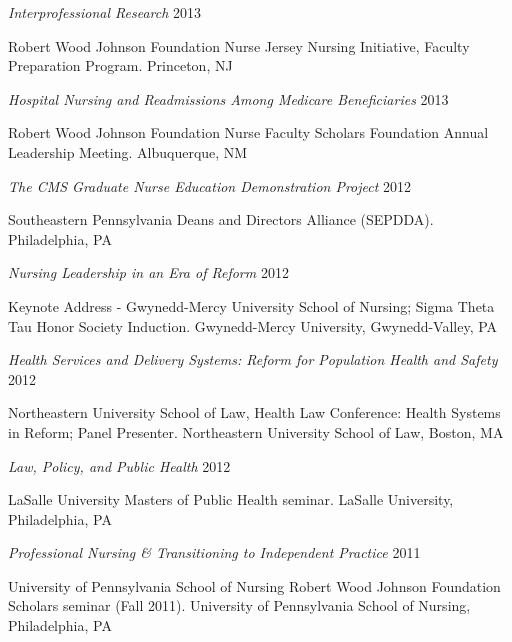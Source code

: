 \documentclass[10pt,]{article}
\begin{document}
{{{{{{{{{{{{{{{\begin{hangparas}{.5in}{1}
{\textit {Interprofessional Research}} \hfill 2013 
\vspace{-2.5mm}
\begin{adjustwidth}{0.5cm}{1cm}
Robert Wood Johnson Foundation Nurse Jersey Nursing Initiative, Faculty Preparation Program. Princeton, NJ
\end{adjustwidth}

{\textit {Hospital Nursing and Readmissions Among Medicare Beneficiaries}} \hfill 2013 
\vspace{-2.5mm}
\begin{adjustwidth}{0.5cm}{1cm}
Robert Wood Johnson Foundation Nurse Faculty Scholars Foundation Annual Leadership Meeting. Albuquerque, NM
\end{adjustwidth}

{\textit {The CMS Graduate Nurse Education Demonstration Project}} \hfill 2012 
\vspace{-2.5mm}
\begin{adjustwidth}{0.5cm}{1cm}
Southeastern Pennsylvania Deans and Directors Alliance (SEPDDA). Philadelphia, PA
\end{adjustwidth}

{\textit {Nursing Leadership in an Era of Reform}} \hfill 2012 
\vspace{-2.5mm}
\begin{adjustwidth}{0.5cm}{1cm}
Keynote Address - Gwynedd-Mercy University School of Nursing; Sigma Theta Tau Honor Society Induction. Gwynedd-Mercy University, Gwynedd-Valley, PA
\end{adjustwidth}

{\textit {Health Services and Delivery Systems: Reform for Population Health and Safety}} \hfill 2012 
\vspace{-2.5mm}
\begin{adjustwidth}{0.5cm}{1cm}
Northeastern University School of Law, Health Law Conference: Health Systems in Reform; Panel Presenter. Northeastern University School of Law, Boston, MA
\end{adjustwidth}

{\textit {Law, Policy, and Public Health}} \hfill 2012 
\vspace{-2.5mm}
\begin{adjustwidth}{0.5cm}{1cm}
LaSalle University Masters of Public Health seminar. LaSalle University, Philadelphia, PA
\end{adjustwidth}

{\textit {Professional Nursing \& Transitioning to Independent Practice}} \hfill 2011 
\vspace{-2.5mm}
\begin{adjustwidth}{0.5cm}{1cm}
University of Pennsylvania School of Nursing Robert Wood Johnson Foundation Scholars seminar (Fall 2011). University of Pennsylvania School of Nursing, Philadelphia, PA
\end{adjustwidth}


\end{hangparas}}}}}}}}}}}}}}}}
\end{document}
